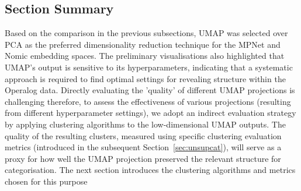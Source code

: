 \documentclass[10pt,oneside]{report}
\begin{document}



\subsection{Section Summary}

Based on the comparison in the previous subsections, UMAP was selected over PCA as the preferred dimensionality reduction technique for the MPNet and Nomic embedding spaces. The preliminary visualisations also highlighted that UMAP's output is sensitive to its hyperparameters, indicating that a systematic approach is required to find optimal settings for revealing structure within the Operalog data. Directly evaluating the 'quality' of different UMAP projections is challenging therefore, to assess the effectiveness of various projections (resulting from different hyperparameter settings), we adopt an indirect evaluation strategy by applying clustering algorithms to the low-dimensional UMAP outputs. The quality of the resulting clusters, measured using specific clustering evaluation metrics (introduced in the subsequent Section~\ref{sec:unsupcat}), will serve as a proxy for how well the UMAP projection preserved the relevant structure for categorisation. The next section introduces the clustering algorithms and metrics chosen for this purpose
\end{document}
